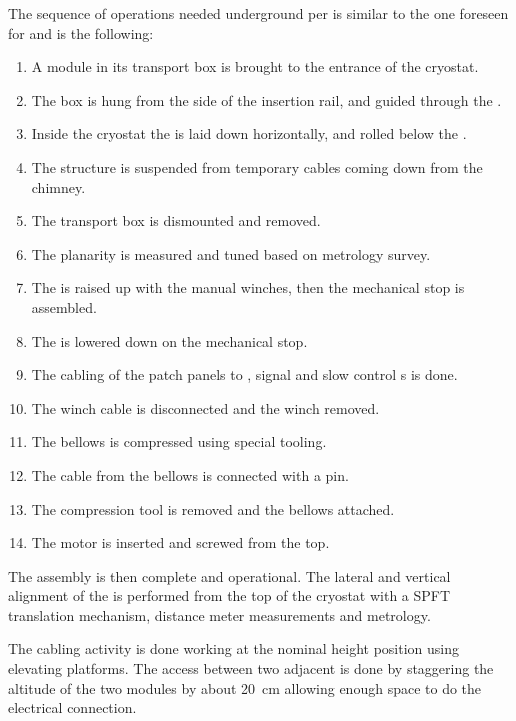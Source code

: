

The sequence of operations needed underground per  is similar to the one foreseen for   and is the following: 
\begin{enumerate}
\item A  module in its transport box is brought to the entrance of the cryostat.
\item The box is hung from the side of the insertion rail, and guided through the .
\item  Inside the cryostat the  is laid down horizontally, and rolled below the .
\item The structure is suspended from temporary cables coming down from the chimney.
\item The transport box is dismounted and removed.
\item The  planarity is measured and tuned based on metrology survey.
\item The  is raised up with the manual winches, then the mechanical stop is assembled.
\item The  is lowered down  on the mechanical stop.
\item The cabling of the  patch panels to , signal and slow control \fdth{}s is done.
\item The winch cable is disconnected  and the winch removed.
\item The bellows is compressed using special tooling.
\item The cable from the bellows is connected with a pin.
\item The compression tool is removed and the bellows attached.
\item The motor is inserted and screwed from the top.
\end{enumerate}
 

The assembly is then complete and operational.
The lateral and vertical alignment of the  is performed from the top of the cryostat with a SPFT translation mechanism, distance meter measurements and metrology.

The cabling activity is done  working at the nominal height position using elevating platforms. The access between two adjacent  is done by staggering the altitude of the two modules by about \SI{20}{cm} allowing enough space to do the electrical connection. 


